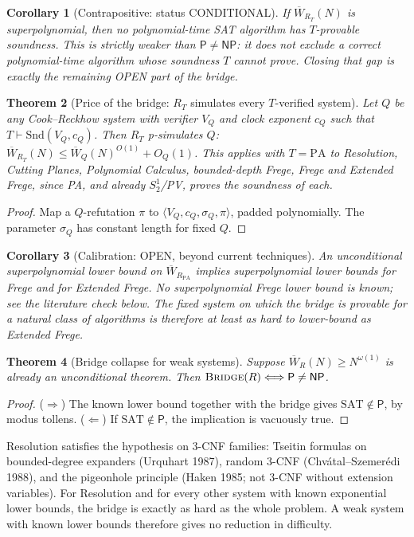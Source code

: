 \documentclass[11pt]{article}
\newtheorem{theorem}{Theorem}
\newtheorem{corollary}[theorem]{Corollary}
\newcommand{\Pclass}{\mathsf P}
\newcommand{\NP}{\mathsf{NP}}
\newcommand{\SAT}{\mathrm{SAT}}
\newcommand{\Wbar}{\overline W}
\newcommand{\Snd}{\mathrm{Snd}}
\begin{document}
\begin{corollary}[Contrapositive: status CONDITIONAL]
If $\Wbar_{R_T}(N)$ is superpolynomial, then no polynomial-time SAT algorithm
has $T$-provable soundness. This is strictly weaker than $\Pclass\neq\NP$:
it does not exclude a correct polynomial-time algorithm whose soundness $T$
cannot prove. Closing that gap is exactly the remaining OPEN part of the bridge.
\end{corollary}

\begin{theorem}[Price of the bridge: $R_T$ simulates every $T$-verified system]\label{thm:sim}
Let $Q$ be any Cook--Reckhow system with verifier $V_Q$ and clock exponent $c_Q$
such that $T\vdash\Snd(V_Q,c_Q)$. Then $R_T$ p-simulates $Q$:
$\Wbar_{R_T}(N)\le\Wbar_Q(N)^{O(1)}+O_Q(1)$.
This applies with $T=\mathrm{PA}$ to Resolution, Cutting Planes, Polynomial
Calculus, bounded-depth Frege, Frege and Extended Frege, since PA, and already
$S^1_2$/PV, proves the soundness of each.
\end{theorem}
\begin{proof}
Map a $Q$-refutation $\pi$ to $\langle V_Q,c_Q,\sigma_Q,\pi\rangle$, padded
polynomially. The parameter $\sigma_Q$ has constant length for fixed $Q$.
\end{proof}

\begin{corollary}[Calibration: OPEN, beyond current techniques]
An unconditional superpolynomial lower bound on $\Wbar_{R_{\mathrm{PA}}}$
implies superpolynomial lower bounds for Frege and for Extended Frege. No
superpolynomial Frege lower bound is known; see the literature check below.
The fixed system on which the bridge is provable for a natural class of
algorithms is therefore at least as hard to lower-bound as Extended Frege.
\end{corollary}

\begin{theorem}[Bridge collapse for weak systems]\label{thm:collapse}
Suppose $\Wbar_R(N)\ge N^{\omega(1)}$ is already an unconditional theorem.
Then $\textsc{Bridge}(R)\Longleftrightarrow\Pclass\neq\NP$.
\end{theorem}
\begin{proof}
($\Rightarrow$) The known lower bound together with the bridge gives
$\SAT\notin\Pclass$, by modus tollens.
($\Leftarrow$) If $\SAT\notin\Pclass$, the implication is vacuously true.
\end{proof}
Resolution satisfies the hypothesis on 3-CNF families: Tseitin formulas on
bounded-degree expanders (Urquhart 1987), random 3-CNF (Chv\'atal--Szemer\'edi
1988), and the pigeonhole principle (Haken 1985; not 3-CNF without extension
variables). For Resolution and for every other system with known exponential
lower bounds, the bridge is exactly as hard as the whole problem. A weak
system with known lower bounds therefore gives no reduction in difficulty.
\end{document}
